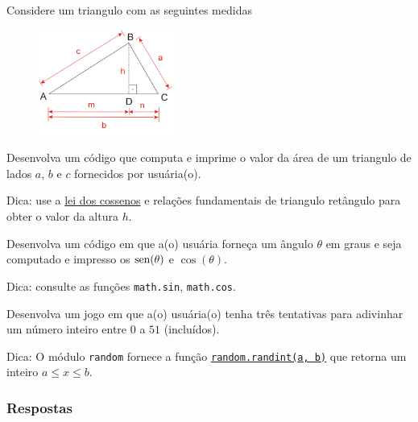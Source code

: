 \begin{exer}
  Considere um triangulo com as seguintes medidas
  \begin{figure}[H]
    \centering
    \includegraphics[width=0.4\textwidth]{./cap_fun/dados/fig_leiDosCossenos/fig}
  \end{figure}
  Desenvolva um código que computa e imprime o valor da área de um triangulo de lados $a$, $b$ e $c$ fornecidos por usuária(o).
\end{exer}
\begin{resp}
  Dica: use a \href{https://pt.wikipedia.org/wiki/Lei_dos_cossenos}{lei dos cossenos} e relações fundamentais de triangulo retângulo para obter o valor da altura $h$. 
\end{resp}

\begin{exer}
  Desenvolva um código em que a(o) usuária forneça um ângulo $\theta$ em graus e seja computado e impresso os $\operatorname{sen}(\theta)$ e $\cos(\theta)$.
\end{exer}
\begin{resp}
  Dica: consulte as funções \lstinline+math.sin+, \lstinline+math.cos+.
\end{resp}

\begin{exer}
  Desenvolva um jogo em que a(o) usuária(o) tenha três tentativas para adivinhar um número inteiro entre $0$ a $51$ (incluídos). 
\end{exer}
\begin{resp}
  Dica: O módulo \lstinline+random+ fornece a função \href{https://docs.python.org/3/library/random.html\#random.randint}{\lstinline+random.randint(a, b)+} que retorna um inteiro $a \leq x \leq b$.
\end{resp}

\ifisbook
\subsubsection{Respostas}
\shipoutAnswer
\fi

